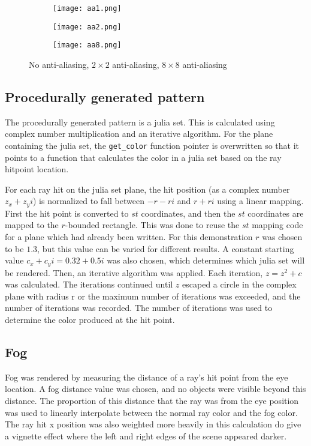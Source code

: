 \documentclass[11pt]{article}
\begin{document}
\begin{figure}
    \centering
    \begin{subfigure}{.25\textwidth}
      \centering
      \texttt{[image: aa1.png]}
    \end{subfigure}%
    \begin{subfigure}{.25\textwidth}
      \centering
      \texttt{[image: aa2.png]}
    \end{subfigure}%
    \begin{subfigure}{.25\textwidth}
      \centering
      \texttt{[image: aa8.png]}
    \end{subfigure}%
    \caption{No anti-aliasing, $2\times 2$ anti-aliasing, $8\times 8$ anti-aliasing}
    \label{fig:aa}
\end{figure}

\subsection{Procedurally generated pattern}
The procedurally generated pattern is a julia set. This is calculated using complex number multiplication and an iterative algorithm. For the plane containing the julia set, the \verb|get_color| function pointer is overwritten so that it points to a function that calculates the color in a julia set based on the ray hitpoint location.

For each ray hit on the julia set plane, the hit position (as a complex number $z_x+z_yi$) is normalized to fall between $-r-ri$ and $r+ri$ using a linear mapping. First the hit point is converted to $st$ coordinates, and then the $st$ coordinates are mapped to the $r$-bounded rectangle. This was done to reuse the $st$ mapping code for a plane which had already been written. For this demonstration $r$ was chosen to be $1.3$, but this value can be varied for different results. A constant starting value $c_x+c_yi = 0.32+0.5i$ was also chosen, which determines which julia set will be rendered. Then, an iterative algorithm was applied. Each iteration, $z = z^2 + c$ was calculated. The iterations continued until $z$ escaped a circle in the complex plane with radius r or the maximum number of iterations was exceeded, and the number of iterations was recorded. The number of iterations was used to determine the color produced at the hit point.

\subsection{Fog}
Fog was rendered by measuring the distance of a ray's hit point from the eye location. A fog distance value was chosen, and no objects were visible beyond this distance. The proportion of this distance that the ray was from the eye position was used to linearly interpolate between the normal ray color and the fog color. The ray hit x position was also weighted more heavily in this calculation do give a vignette effect where the left and right edges of the scene appeared darker.
\end{document}
